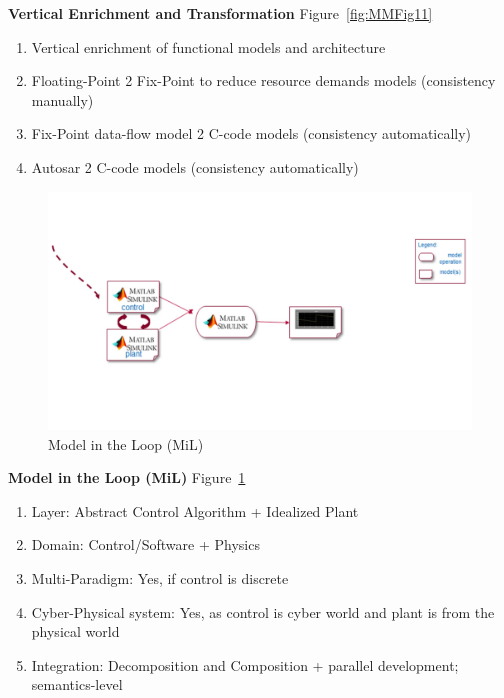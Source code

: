 {{\bf Vertical Enrichment and  Transformation} Figure~\ref{fig:MMFig11}
\begin{enumerate}
    \item Vertical enrichment of functional models and architecture
\item Floating-Point 2 Fix-Point to reduce resource demands models (consistency manually)
\item Fix-Point data-flow model 2 C-code models (consistency automatically)
\item Autosar 2 C-code models (consistency automatically)
\end{enumerate}

\begin{figure}[!htb]
\centering
\includegraphics[scale=0.33]{figures/mm-hpi14.pdf}
\caption{Model in the Loop (MiL)}
\label{fig:MMFig12}
\end{figure}

{\bf Model in the Loop (MiL)} Figure~\ref{fig:MMFig12}

\begin{enumerate}
    \item Layer: Abstract Control Algorithm + Idealized Plant
\item Domain: Control/Software + Physics
\item Multi-Paradigm: Yes, if control is discrete 
\item Cyber-Physical system: Yes, as control is cyber world and plant is from the physical world
\item Integration: Decomposition and Composition + parallel development; semantics-level
\end{enumerate}

}
